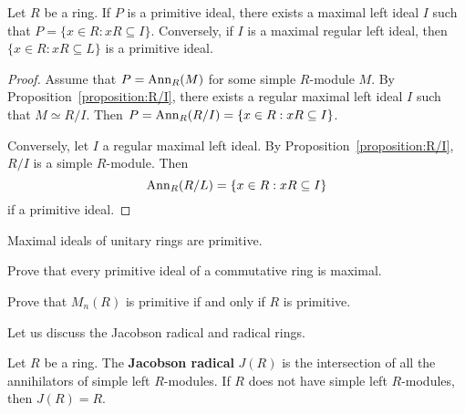 \begin{lemma}
	\label{lemma:maxprim}
	Let $R$ be a ring. If $P$ is a primitive ideal, there exists a maximal 
	left ideal $I$ such that $P=\{x\in R:xR\subseteq I\}$.
	Conversely, if $I$ is a maximal regular left ideal, then 
	$\{x\in R:xR\subseteq L\}$ is a primitive ideal. 
\end{lemma}

\begin{proof}
	Assume that $P=\operatorname{Ann}_R(M)$ for some simple $R$-module $M$. By
	Proposition~\ref{proposition:R/I}, there exists a regular maximal 
	left ideal 
	$I$ such that $M\simeq R/I$. Then $P=\operatorname{Ann}_R(R/I)=\{x\in
	R:xR\subseteq I\}$. 

	Conversely, let $I$ a regular maximal left ideal. By
	Proposition~\ref{proposition:R/I}, $R/I$ is a simple $R$-module. Then
	\[
	\operatorname{Ann}_R(R/L)=\{x\in R:xR\subseteq I\}
	\]
	if a primitive ideal.
\end{proof}


\begin{exercise}
\label{xca:maximal=>prim}
    Maximal ideals of unitary rings are primitive.  
\end{exercise}

\begin{exercise}
	Prove that every primitive ideal of a commutative ring is maximal.
\end{exercise}

\begin{exercise}
    Prove that $M_n(R)$ is primitive if and only if $R$ is primitive.
\end{exercise}


Let us discuss the Jacobson radical and radical rings. 

\begin{definition}

Let $R$ be a ring. The \textbf{Jacobson radical} $J(R)$
is the intersection of all the annihilators of simple left $R$-modules. If $R$ does not
have simple left $R$-modules, then $J(R)=R$. 
\end{definition}

